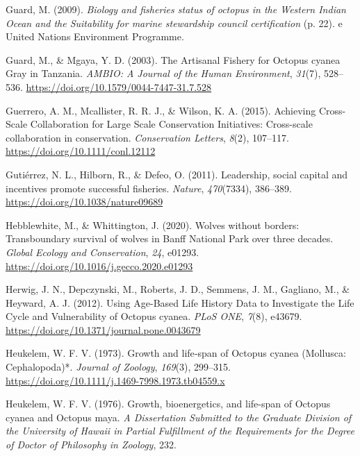 \documentclass[
]{article}
\newlength{\cslhangindent}
\newlength{\cslentryspacingunit} %
\newenvironment{CSLReferences}[2] %
 {%
  \setlength{\parindent}{0pt}
  \ifodd #1
  \let\oldpar\par
  \def\par{\hangindent=\cslhangindent\oldpar}
  \fi
  \setlength{\parskip}{#2\cslentryspacingunit}
 }%
 {}
\begin{document}
\begin{CSLReferences}{1}{2}
\leavevmode{}%
Guard, M. (2009). \emph{Biology and fisheries status of octopus in the {Western} {Indian} {Ocean} and the {Suitability} for marine stewardship council certification} (p. 22). e United Nations Environment Programme.

\leavevmode{}%
Guard, M., \& Mgaya, Y. D. (2003). The {Artisanal} {Fishery} for {Octopus} cyanea {Gray} in {Tanzania}. \emph{AMBIO: A Journal of the Human Environment}, \emph{31}(7), 528--536. \url{https://doi.org/10.1579/0044-7447-31.7.528}

\leavevmode{}%
Guerrero, A. M., Mcallister, R. R. J., \& Wilson, K. A. (2015). Achieving {Cross}-{Scale} {Collaboration} for {Large} {Scale} {Conservation} {Initiatives}: {Cross}-scale collaboration in conservation. \emph{Conservation Letters}, \emph{8}(2), 107--117. \url{https://doi.org/10.1111/conl.12112}

\leavevmode{}%
Gutiérrez, N. L., Hilborn, R., \& Defeo, O. (2011). Leadership, social capital and incentives promote successful fisheries. \emph{Nature}, \emph{470}(7334), 386--389. \url{https://doi.org/10.1038/nature09689}

\leavevmode{}%
Hebblewhite, M., \& Whittington, J. (2020). Wolves without borders: {Transboundary} survival of wolves in {Banff} {National} {Park} over three decades. \emph{Global Ecology and Conservation}, \emph{24}, e01293. \url{https://doi.org/10.1016/j.gecco.2020.e01293}

\leavevmode{}%
Herwig, J. N., Depczynski, M., Roberts, J. D., Semmens, J. M., Gagliano, M., \& Heyward, A. J. (2012). Using {Age}-{Based} {Life} {History} {Data} to {Investigate} the {Life} {Cycle} and {Vulnerability} of {Octopus} cyanea. \emph{PLoS ONE}, \emph{7}(8), e43679. \url{https://doi.org/10.1371/journal.pone.0043679}

\leavevmode{}%
Heukelem, W. F. V. (1973). Growth and life‐span of {Octopus} cyanea ({Mollusca}: {Cephalopoda})*. \emph{Journal of Zoology}, \emph{169}(3), 299--315. \url{https://doi.org/10.1111/j.1469-7998.1973.tb04559.x}

\leavevmode{}%
Heukelem, W. F. V. (1976). Growth, bioenergetics, and life-span of {Octopus} cyanea and {Octopus} maya. \emph{A Dissertation Submitted to the Graduate Division of the University of Hawaii in Partial Fulfillment of the Requirements for the Degree of Doctor of Philosophy in Zoology}, 232.


\end{CSLReferences}
\end{document}
